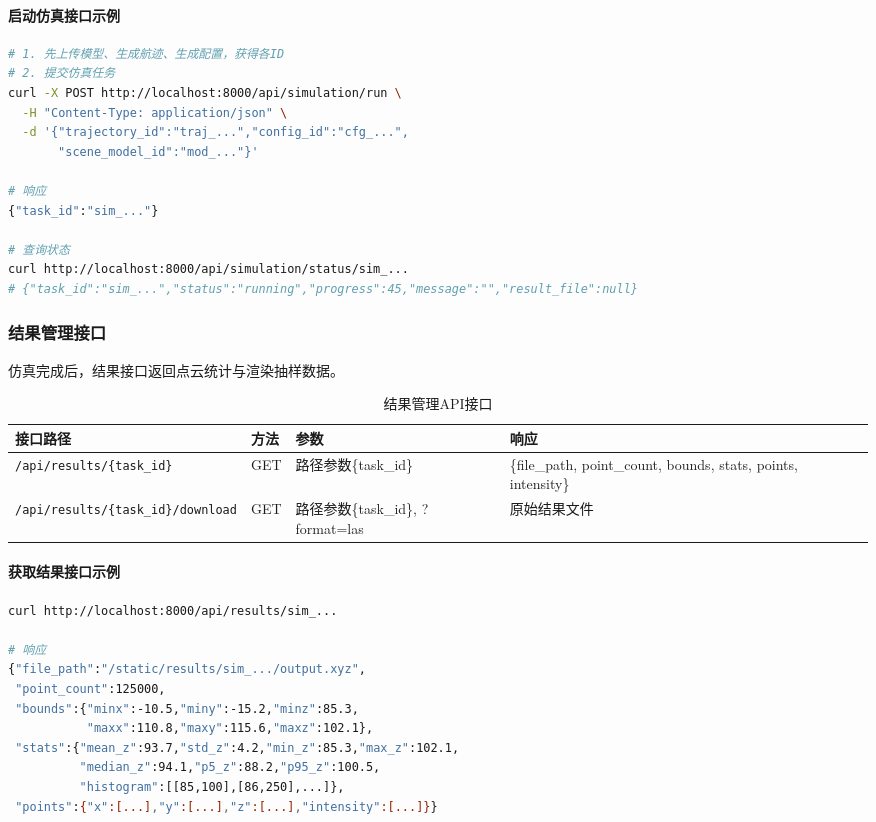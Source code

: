 \documentclass[a4paper,fleqn]{cas-sc}
\begin{document}
\paragraph{启动仿真接口示例}
\begin{lstlisting}[language=bash,caption=启动仿真]
# 1. 先上传模型、生成航迹、生成配置，获得各ID
# 2. 提交仿真任务
curl -X POST http://localhost:8000/api/simulation/run \
  -H "Content-Type: application/json" \
  -d '{"trajectory_id":"traj_...","config_id":"cfg_...",
       "scene_model_id":"mod_..."}'

# 响应
{"task_id":"sim_..."}

# 查询状态
curl http://localhost:8000/api/simulation/status/sim_...
# {"task_id":"sim_...","status":"running","progress":45,"message":"","result_file":null}
\end{lstlisting}

\subsubsection{结果管理接口}
仿真完成后，结果接口返回点云统计与渲染抽样数据。

\begin{table}[pos=!htbp]
    \centering
    \caption{结果管理API接口}
    \label{tab:api-results}
    \begin{tabular}{@{} llll @{}}
        \toprule
        \textbf{接口路径}                               & \textbf{方法} & \textbf{参数}                   & \textbf{响应}                                                    \\
        \midrule
        \texttt{/api/results/\{task\_id\}}          & GET         & 路径参数\{task\_id\}              & \{file\_path, point\_count, bounds, stats, points, intensity\} \\
        \texttt{/api/results/\{task\_id\}/download} & GET         & 路径参数\{task\_id\}, ?format=las & 原始结果文件                                                         \\
        \bottomrule
    \end{tabular}
\end{table}

\paragraph{获取结果接口示例}
\begin{lstlisting}[language=bash,caption=获取结果]
curl http://localhost:8000/api/results/sim_...

# 响应
{"file_path":"/static/results/sim_.../output.xyz",
 "point_count":125000,
 "bounds":{"minx":-10.5,"miny":-15.2,"minz":85.3,
           "maxx":110.8,"maxy":115.6,"maxz":102.1},
 "stats":{"mean_z":93.7,"std_z":4.2,"min_z":85.3,"max_z":102.1,
          "median_z":94.1,"p5_z":88.2,"p95_z":100.5,
          "histogram":[[85,100],[86,250],...]},
 "points":{"x":[...],"y":[...],"z":[...],"intensity":[...]}}
\end{lstlisting}
\end{document}
